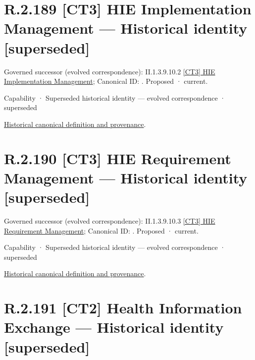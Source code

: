 \section*{R.2.189 [CT3] HIE Implementation Management — Historical identity [superseded]}
\label{navigation:R.2.189}

{\small Governed successor (evolved correspondence): II.1.3.9.10.2 \hyperref[element:8ce29be373e04252b7aa881b6a72f375]{[CT3] HIE Implementation Management}; Canonical ID: \texttt{}. Proposed · current.}\par
\label{element:a99b4119339545a89dc54ebb216ddb85}
{\small Capability · Superseded historical identity — evolved correspondence · superseded}\par
\href{../../../../../../../continuum/strategy/capability/a99b4119339545a89dc54ebb216ddb85.md}{Historical canonical definition and provenance}.\par
\section*{R.2.190 [CT3] HIE Requirement Management — Historical identity [superseded]}
\label{navigation:R.2.190}

{\small Governed successor (evolved correspondence): II.1.3.9.10.3 \hyperref[element:1c852a1799984feba50011172983c865]{[CT3] HIE Requirement Management}; Canonical ID: \texttt{}. Proposed · current.}\par
\label{element:a32c8bff0c284f5c9d6ab1f46991c232}
{\small Capability · Superseded historical identity — evolved correspondence · superseded}\par
\href{../../../../../../../continuum/strategy/capability/a32c8bff0c284f5c9d6ab1f46991c232.md}{Historical canonical definition and provenance}.\par
\section*{R.2.191 [CT2] Health Information Exchange — Historical identity [superseded]}
\label{navigation:R.2.191}


